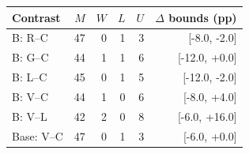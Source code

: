 \begin{tabular}{@{}lrrrrr@{}}
\toprule
Contrast & $M$ & $W$ & $L$ & $U$ & $\Delta$ bounds (pp)\\
\midrule
B: R--C & 47 & 0 & 1 & 3 & [-8.0, -2.0]\\
B: G--C & 44 & 1 & 1 & 6 & [-12.0, +0.0]\\
B: L--C & 45 & 0 & 1 & 5 & [-12.0, -2.0]\\
B: V--C & 44 & 1 & 0 & 6 & [-8.0, +4.0]\\
B: V--L & 42 & 2 & 0 & 8 & [-6.0, +16.0]\\
Base: V--C & 47 & 0 & 1 & 3 & [-6.0, +0.0]\\
\bottomrule
\end{tabular}
